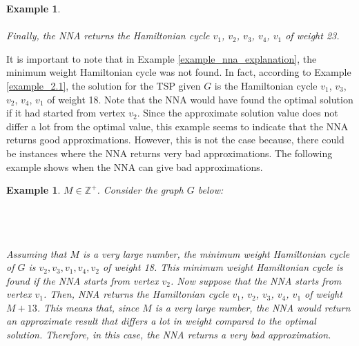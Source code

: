 \documentclass{article}
\newtheorem{example}[definition]{Example}
\begin{document}
\begin{example}
\\\\
Finally, the NNA returns the Hamiltonian cycle $v_1$, $v_2$, $v_3$, $v_4$, $v_1$ of weight 23.
\end{example}
It is important to note that in Example \ref{example_nna_explanation}, the minimum weight Hamiltonian cycle was not found. In fact, according to Example \ref{example_2.1}, the solution for the TSP given $G$ is the Hamiltonian cycle $v_1$, $v_3$, $v_2$, $v_4$, $v_1$ of weight 18. Note that the NNA would have found the optimal solution if it had started from vertex $v_2$. Since the approximate solution value does not differ a lot from the optimal value, this example seems to indicate that the NNA returns good approximations. However, this is not the case because, there could be instances where the NNA returns very bad approximations. The following example shows when the NNA can give bad approximations.
\begin{example}
\label{nna_fail}
 $M \in \mathbb{Z}^+$. Consider the graph $G$ below:
\\\\
\\\\
Assuming that $M$ is a very large number, the minimum weight Hamiltonian cycle of $G$ is $v_2, v_3, v_1, v_4, v_2$ of weight 18. This minimum weight Hamiltonian cycle is found if the NNA starts from vertex $v_2$. Now suppose that the NNA starts from vertex $v_1$. Then, NNA returns the Hamiltonian cycle $v_1$, $v_2$, $v_3$, $v_4$, $v_1$ of weight $M + 13$. This means that, since $M$ is a very large number, the NNA would return an approximate result that differs a lot in weight compared to the optimal solution. Therefore, in this case, the NNA returns a very bad approximation.
\end{example}
\end{document}
